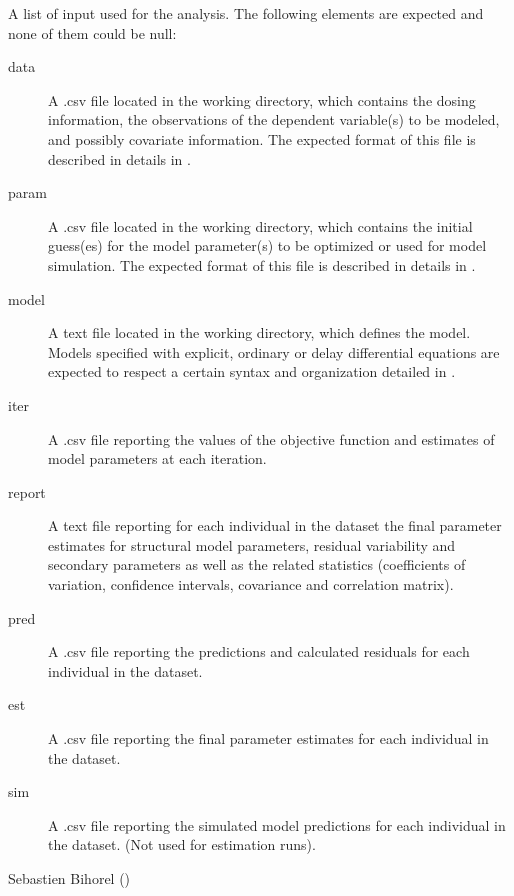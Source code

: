 \begin{Arguments}
\begin{ldescription}
\begin{description}
\end{description}


\item[\code{files}] A list of input used for the analysis. The following elements are
expected and none of them could be null: \begin{description}

\item[data] A .csv file located in the working directory, which contains
the dosing information, the observations of the dependent variable(s)
to be modeled, and possibly covariate information. The expected format 
of this file is described in details in .
\item[param] A .csv file located in the working directory, which contains
the initial guess(es) for the model parameter(s) to be optimized or used
for model simulation. The expected format of this file is described in
details in .
\item[model] A text file located in the working directory, which defines 
the model. Models specified with explicit, ordinary or delay 
differential equations are expected to respect a certain syntax and 
organization detailed in .
\item[iter] A .csv file reporting the values of the objective function
and estimates of model parameters at each iteration.
\item[report] A text file reporting for each individual in the dataset the
final parameter estimates for structural model parameters, residual 
variability and secondary parameters as well as the related statistics 
(coefficients of variation, confidence intervals, covariance and 
correlation matrix).
\item[pred] A .csv file reporting the predictions and calculated residuals
for each individual in the dataset.
\item[est] A .csv file reporting the final parameter estimates for each
individual in the dataset.
\item[sim] A .csv file reporting the simulated model predictions for each 
individual in the dataset. (Not used for estimation runs).

\end{description}


\end{ldescription}
\end{Arguments}
%
\begin{Author}\relax
Sebastien Bihorel ()
\end{Author}

